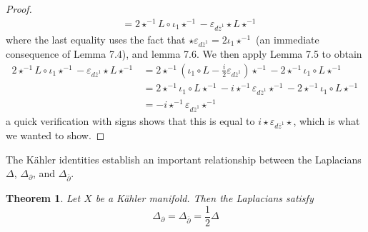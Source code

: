 \documentclass[psamsfonts, 12pt]{amsart}
\newtheorem{thm}{Theorem}[section]
\theoremstyle{definition}
\theoremstyle{remark}
\newcommand{\dbar}{\overline{\partial}}
\newcommand{\zbar}{\overline{z}}
\newcommand{\inv}{^{-1}}
\begin{document}
\begin{proof}
\begin{align*}
&= 2\star\inv L\circ\iota_1\star\inv - \varepsilon_{d\zbar^1}\star L\star\inv
\end{align*}
where the last equality uses the fact that
$\star\varepsilon_{d\zbar^1} = 2\iota_1\star\inv$ (an immediate consequence of Lemma
7.4), and lemma 7.6. We then apply Lemma 7.5 to obtain
\begin{align*}
2\star\inv L\circ\iota_1\star\inv - \varepsilon_{d\zbar^1}\star L\star\inv
&= 2\star\inv\left(\iota_1\circ L - \frac{i}{2}\varepsilon_{d\zbar^1}\right)\star\inv
- 2\star\inv\iota_1\circ L\star\inv \\
&= 2\star\inv\iota_1\circ L\star\inv - i\star\inv\varepsilon_{d\zbar^1}\star\inv
- 2\star\inv\iota_1\circ L\star\inv \\
&= -i\star\inv\varepsilon_{d\zbar^1}\star\inv
\end{align*}
a quick verification with signs shows that this is equal to
$i\star\varepsilon_{d\zbar^1}\star$, which is what we wanted to show.
\end{proof}
%
The K\"ahler identities establish an important relationship between the Laplacians
$\Delta$, $\Delta_\partial$, and $\Delta_{\dbar}$.
%
\begin{thm}
Let $X$ be a K\"ahler manifold. Then the Laplacians satisfy
\[
\Delta_\partial = \Delta_{\dbar} = \frac{1}{2}\Delta
\]
\end{thm}
%
\end{document}
